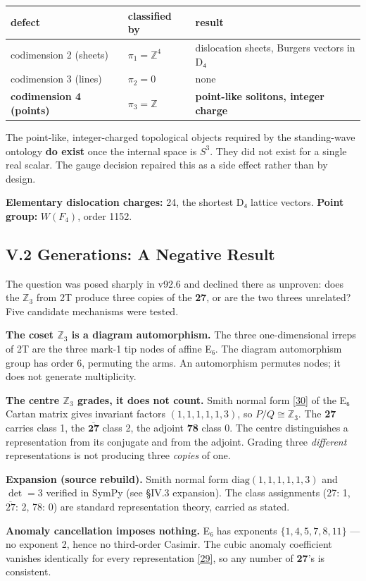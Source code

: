\documentclass[a4paper,11pt]{article}
\newcommand{\expansion}[1]{\par\smallskip\noindent\textbf{Expansion (source rebuild).} #1\par\smallskip}
\begin{document}
\begin{center}
\begin{tabular}{lll}
\hline
defect & classified by & result \\
\hline
codimension 2 (sheets) & $\pi_1=\mathbb{Z}^4$ & dislocation sheets, Burgers vectors in D₄ \\
codimension 3 (lines) & $\pi_2=0$ & none \\
\textbf{codimension 4 (points)} & $\pi_3=\mathbb{Z}$ & \textbf{point-like solitons, integer charge} \\
\hline
\end{tabular}
\end{center}

The point-like, integer-charged topological objects required by the standing-wave ontology \textbf{do exist} once the internal space is $S^3$. They did not exist for a single real scalar. The gauge decision repaired this as a side effect rather than by design.

\textbf{Elementary dislocation charges:} 24, the shortest D₄ lattice vectors. \textbf{Point group:} $W(F_4)$, order 1152.

\subsection*{V.2 Generations: A Negative Result}

The question was posed sharply in v92.6 and declined there as unproven: does the $\mathbb{Z}_3$ from 2T produce three copies of the \textbf{27}, or are the two threes unrelated? Five candidate mechanisms were tested.

\textbf{The coset $\mathbb{Z}_3$ is a diagram automorphism.} The three one-dimensional irreps of 2T are the three mark-1 tip nodes of affine E₆. The diagram automorphism group has order 6, permuting the arms. An automorphism permutes nodes; it does not generate multiplicity.

\textbf{The centre $\mathbb{Z}_3$ grades, it does not count.} Smith normal form \hyperref[ref30]{[30]} of the E₆ Cartan matrix gives invariant factors $(1,1,1,1,1,3)$, so $P/Q\cong\mathbb{Z}_3$. The \textbf{27} carries class 1, the $\overline{\mathbf{27}}$ class 2, the adjoint \textbf{78} class 0. The centre distinguishes a representation from its conjugate and from the adjoint. Grading three \textit{different} representations is not producing three \textit{copies} of one.


\expansion{Smith normal form $\mathrm{diag}(1,1,1,1,1,3)$ and $\det = 3$ verified in SymPy (see \S IV.3 expansion). The class assignments (27: 1, $\overline{27}$: 2, 78: 0) are standard representation theory, carried as stated.}
\textbf{Anomaly cancellation imposes nothing.} E₆ has exponents $\{1,4,5,7,8,11\}$ — no exponent 2, hence no third-order Casimir. The cubic anomaly coefficient vanishes identically for every representation \hyperref[ref29]{[29]}, so any number of \textbf{27}'s is consistent.
\end{document}
